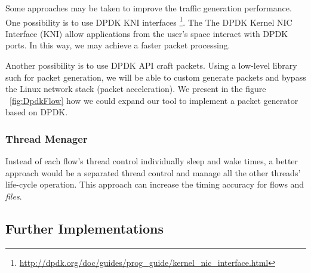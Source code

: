 Some approaches may be taken to improve the traffic generation performance. One possibility is to use DPDK KNI interfaces \footnote{\href{http://dpdk.org/doc/guides/prog_guide/kernel_nic_interface.html}{http://dpdk.org/doc/guides/prog\_guide/kernel\_nic\_interface.html}}. The The DPDK Kernel NIC Interface (KNI) allow applications from the user's space interact with DPDK ports. In this way, we may achieve a faster packet processing. 

Another possibility is to use DPDK API craft packets. Using a low-level library such for packet generation, we will be able to custom generate packets and bypass the Linux network stack (packet acceleration). We present in the figure ~\ref{fig:DpdkFlow} how we could expand our tool to implement a packet generator based on DPDK.


\subsubsection{Thread Menager}

Instead of each flow's thread control individually sleep and wake times, a better approach would be a separated thread control and manage all the other threads' life-cycle operation. This approach can increase the timing accuracy for flows and \textit{files}.





\subsection{Further Implementations}


